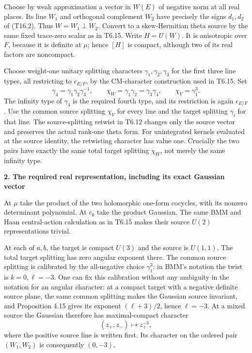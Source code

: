 Choose by weak approximation a vector in \(W(E)\) of negative norm at all real places. Its line \(W_1\) and orthogonal complement \(W_2\) have precisely the signs \(d_1,d_2\) of (T16.2). Thus \(W=W_1\perp W_2\). Convert to a skew-Hermitian theta source by the same fixed trace-zero scalar as in T6.15. Write \(H=U(W)\). It is anisotropic over \(F\), because it is definite at \(\mu\); hence \([H]\) is compact, although two of its real factors are noncompact.

Choose weight-one unitary splitting characters \(\gamma_1,\gamma_2,\gamma_3\) for the first three line types, all restricting to \(\epsilon_{E/F}\), by the CM-character construction used in T6.15. Set \[
\gamma_4=\gamma_1\gamma_2\gamma_3^{-1},\qquad
\chi_W=\gamma_1\gamma_2=\gamma_3\gamma_4,\qquad
\chi_V=\gamma_1^3.
\tag{T16.3}
\] The infinity type of \(\gamma_4\) is the required fourth type, and its restriction is again \(\epsilon_{E/F}\). Use the common source splitting \(\chi_V\) for every line and the target splitting \(\gamma_i\) for that line. The source-splitting retwist in T6.12 changes only the source vector and preserves the actual rank-one theta form. For unintegrated kernels evaluated at the source identity, the retwisting character has value one. Crucially the two pairs have exactly the same total target splitting \(\chi_W\), not merely the same infinity type.

\textbf{2. The required real representation, including its exact Gaussian vector}

At \(\mu\) take the product of the two holomorphic one-form cocycles, with its nonzero determinant polynomial. At \(c_0\) take the product Gaussian. The same BMM and Haan central-action calculation as in T6.15 makes their source \(U(2)\) representations trivial.

At each of \(a,b\), the target is compact \(U(3)\) and the source is \(U(1,1)\). The total target splitting has zero angular exponent there. The common source splitting is calibrated by the all-negative choice \(\gamma_1^3\): in BMM's notation the twist is \(k=0,\ell=-3\). One can fix this calibration without any ambiguity in the notation for an angular character: at a compact target with a negative definite source plane, the same common splitting makes the Gaussian source invariant, and Proposition 4.15 gives its exponent \((\ell+3)/2\), hence \(\ell=-3\). At a mixed source the Gaussian therefore has maximal-compact character \[
(z_+,z_-)\longmapsto z_+^{-3},
\tag{T16.4}
\] where the positive source line is written first. Its character on the ordered pair \((W_1,W_2)\) is consequently \((0,-3)\).

